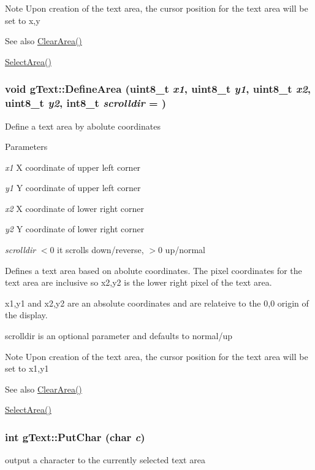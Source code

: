 \begin{DoxyNote}{Note}
Upon creation of the text area, the cursor position for the text area will be set to x,y
\end{DoxyNote}
\begin{DoxySeeAlso}{See also}
\hyperlink{classg_text_a8918c2e7b5b1121a6c9051db049c85bf}{ClearArea()} 

\hyperlink{classg_text_a3d2fcd1f48b1e44611b7cf6fb2bae5db}{SelectArea()} 
\end{DoxySeeAlso}
\hypertarget{classg_text_a8bc94b15c7864ef34491e8ef5681bfd4}{
\subsubsection[{DefineArea}]{\setlength{\rightskip}{0pt plus 5cm}void gText::DefineArea (uint8\_\-t {\em x1}, \/  uint8\_\-t {\em y1}, \/  uint8\_\-t {\em x2}, \/  uint8\_\-t {\em y2}, \/  int8\_\-t {\em scrolldir} = {})}}
\label{classg_text_a8bc94b15c7864ef34491e8ef5681bfd4}
Define a text area by abolute coordinates


\begin{DoxyParams}{Parameters}
\item[{\em x1}]X coordinate of upper left corner \item[{\em y1}]Y coordinate of upper left corner \item[{\em x2}]X coordinate of lower right corner \item[{\em y2}]Y coordinate of lower right corner \item[{\em scrolldir}]$<$0 it scrolls down/reverse, $>$0 up/normal\end{DoxyParams}
Defines a text area based on abolute coordinates. The pixel coordinates for the text area are inclusive so x2,y2 is the lower right pixel of the text area.

x1,y1 and x2,y2 are an absolute coordinates and are relateive to the 0,0 origin of the display.

scrolldir is an optional parameter and defaults to normal/up

\begin{DoxyNote}{Note}
Upon creation of the text area, the cursor position for the text area will be set to x1,y1
\end{DoxyNote}
\begin{DoxySeeAlso}{See also}
\hyperlink{classg_text_a8918c2e7b5b1121a6c9051db049c85bf}{ClearArea()} 

\hyperlink{classg_text_a3d2fcd1f48b1e44611b7cf6fb2bae5db}{SelectArea()} 
\end{DoxySeeAlso}
\hypertarget{classg_text_a368fbed0d50735647595f2d12cbe167c}{
\subsubsection[{PutChar}]{\setlength{\rightskip}{0pt plus 5cm}int gText::PutChar (char {\em c})}}
\label{classg_text_a368fbed0d50735647595f2d12cbe167c}
output a character to the currently selected text area


